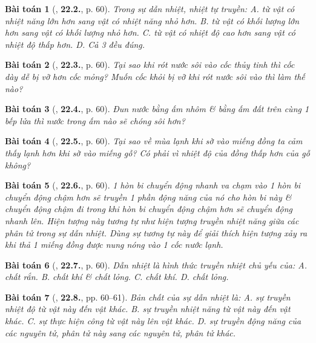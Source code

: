 \documentclass{article}
\numberwithin{equation}{section}
\newtheorem{baitoan}{Bài toán}
\begin{document}
\begin{baitoan}[\cite{SBT_Vat_Ly_8}, \textbf{22.2.}, p. 60]
	Trong sự dẫn nhiệt, nhiệt tự truyền: {\sf A.} từ vật có nhiệt năng lớn hơn sang vật có nhiệt năng nhỏ hơn. {\sf B.} từ vật có khối lượng lớn hơn sang vật có khối lượng nhỏ hơn. {\sf C.} từ vật có nhiệt độ cao hơn sang vật có nhiệt độ thấp hơn. {\sf D.} Cả 3 đều đúng.
\end{baitoan}

\begin{baitoan}[\cite{SBT_Vat_Ly_8}, \textbf{22.3.}, p. 60]
	Tại sao khi rót nước sôi vào cốc thủy tinh thì cốc dày dễ bị vỡ hơn cốc mỏng? Muốn cốc khỏi bị vỡ khi rót nước sôi vào thì làm thế nào?
\end{baitoan}

\begin{baitoan}[\cite{SBT_Vat_Ly_8}, \textbf{22.4.}, p. 60]
	Đun nước bằng ấm nhôm \& bằng ấm đất trên cùng 1 bếp lửa thì nước trong ấm nào sẽ chóng sôi hơn?
\end{baitoan}

\begin{baitoan}[\cite{SBT_Vat_Ly_8}, \textbf{22.5.}, p. 60]
	Tại sao về mùa lạnh khi sờ vào miếng đồng ta cảm thấy lạnh hơn khi sờ vào miếng gỗ? Có phải vì nhiệt độ của đồng thấp hơn của gỗ không?
\end{baitoan}

\begin{baitoan}[\cite{SBT_Vat_Ly_8}, \textbf{22.6.}, p. 60]
	1 hòn bi chuyển động nhanh va chạm vào 1 hòn bi chuyển động chậm hơn sẽ truyền 1 phần động năng của nó cho hòn bi này \& chuyển động chậm đi trong khi hòn bi chuyển động chậm hơn sẽ chuyển động nhanh lên. Hiện tượng này tương tự như hiện tượng truyền nhiệt năng giữa các phân tử trong sự dẫn nhiệt. Dùng sự tương tự này để giải thích hiện tượng xảy ra khi thả 1 miếng đồng được nung nóng vào 1 cốc nước lạnh.
\end{baitoan}

\begin{baitoan}[\cite{SBT_Vat_Ly_8}, \textbf{22.7.}, p. 60]
	Dẫn nhiệt là hình thức truyền nhiệt chủ yếu của: {\sf A.} chất rắn. {\sf B.} chất khí \& chất lỏng. {\sf C.} chất khí. {\sf D.} chất lỏng.
\end{baitoan}

\begin{baitoan}[\cite{SBT_Vat_Ly_8}, \textbf{22.8.}, pp. 60--61]
	Bản chất của sự dẫn nhiệt là: {\sf A.} sự truyền nhiệt độ từ vật này đến vật khác. {\sf B.} sự truyền nhiệt năng từ vật này đến vật khác. {\sf C.} sự thực hiện công từ vật này lên vật khác. {\sf D.} sự truyền động năng của các nguyên tử, phân tử này sang các nguyên tử, phân tử khác.
\end{baitoan}
\end{document}
